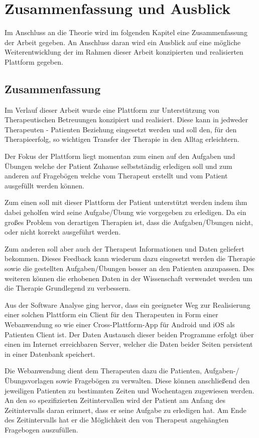 \chapter{Zusammenfassung und Ausblick} \label{_ZusammenfassungundAusblick}
Im Anschluss an die Theorie wird im folgenden Kapitel eine Zusammenfassung der Arbeit gegeben. An Anschluss daran wird ein Ausblick auf eine mögliche Weiterentwicklung der im Rahmen dieser Arbeit konzipierten und realisierten Plattform gegeben. 
\section{Zusammenfassung}
Im Verlauf dieser Arbeit wurde eine Plattform zur Unterstützung von Therapeutischen Betreuungen konzipiert und realisiert. Diese kann in jedweder Therapeuten - Patienten Beziehung eingesetzt werden und soll den, für den Therapieerfolg, so wichtigen Transfer der Therapie in den Alltag erleichtern.

Der Fokus der Plattform liegt momentan zum einen auf den Aufgaben und Übungen welche der Patient Zuhause selbstständig erledigen soll und zum anderen auf Fragebögen welche vom Therapeut erstellt und vom Patient ausgefüllt werden können.

Zum einen soll mit dieser Plattform der Patient unterstützt werden indem ihm dabei geholfen wird seine Aufgabe/Übung wie vorgegeben zu erledigen. Da ein großes Problem von derartigen Therapien ist, dass die Aufgaben/Übungen nicht, oder nicht korrekt ausgeführt werden.

Zum anderen soll aber auch der Therapeut Informationen und Daten geliefert bekommen. Dieses Feedback kann wiederum dazu eingesetzt werden die Therapie sowie die gestellten Aufgaben/Übungen besser an den Patienten anzupassen. Des weiteren können die erhobenen Daten in der Wissenschaft verwendet werden um die Therapie Grundlegend zu verbessern.

Aus der Software Analyse ging hervor, dass ein geeigneter Weg zur Realisierung einer solchen Plattform ein Client für den Therapeuten in Form einer Webanwendung so wie einer Cross-Plattform-App für Android und iOS als Patienten Client ist. Der Daten Austausch dieser beiden Programme erfolgt über einen im Internet erreichbaren Server, welcher die Daten beider Seiten persistent in einer Datenbank speichert.

Die Webanwendung dient dem Therapeuten dazu die Patienten, Aufgaben-/Übungsvorlagen sowie Fragebögen zu verwalten. Diese können anschließend den jeweiligen Patienten zu bestimmten Zeiten und Wochentagen zugewiesen werden. An den so spezifizierten Zeitintervallen wird der Patient am Anfang des Zeitintervalls daran erinnert, dass er seine Aufgabe zu erledigen hat. Am Ende des Zeitintervalls hat er die Möglichkeit den von Therapeut angehängten Fragebogen auszufüllen.


